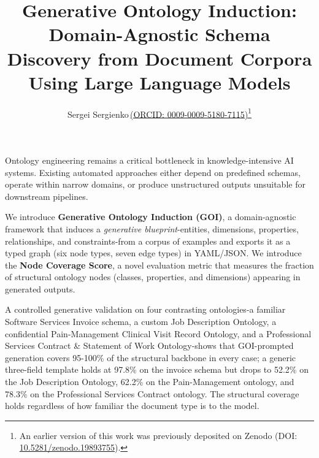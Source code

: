 \documentclass[runningheads,a4paper]{llncs}
\makeatletter
\renewenvironment{abstract}{%
  \list{}{\advance\topsep by0.35cm\relax\small
    \leftmargin=0pt
    \labelwidth=\z@
    \listparindent=\z@
    \itemindent\listparindent
    \rightmargin=0pt}%
  \item[\hskip\labelsep\bfseries\abstractname]}
{\endlist}
\makeatother
\begin{document}

\title{Generative Ontology Induction: Domain-Agnostic Schema Discovery
from Document Corpora Using Large Language Models}


\author{Sergei Sergienko\,\href{https://orcid.org/0009-0009-5180-7115}{(ORCID: 0009-0009-5180-7115)}\thanks{An earlier version of this work was previously deposited on Zenodo (DOI: \href{https://doi.org/10.5281/zenodo.19893755}{10.5281/zenodo.19893755}).}}



\maketitle

\begin{abstract}
{\normalsize
Ontology engineering remains a critical bottleneck in knowledge-intensive
AI systems. Existing automated approaches either depend on predefined
schemas, operate within narrow domains, or produce unstructured outputs
unsuitable for downstream pipelines.

We introduce \textbf{Generative Ontology Induction (GOI)}, a
domain-agnostic framework that induces a \emph{generative
blueprint}-entities, dimensions, properties, relationships, and
constraints-from a corpus of examples and exports it as a typed graph
(six node types, seven edge types) in YAML/JSON. We introduce the
\textbf{Node Coverage Score}, a novel evaluation metric that measures
the fraction of structural ontology nodes (classes, properties, and
dimensions) appearing in generated outputs.

A controlled generative validation on four contrasting ontologies-a
familiar Software Services Invoice schema, a custom Job Description
Ontology, a confidential Pain-Management Clinical Visit Record
Ontology, and a Professional Services Contract \& Statement of Work
Ontology-shows that GOI-prompted generation covers 95-100\% of the
structural backbone in every case; a generic three-field template
holds at 97.8\% on the invoice schema but drops to 52.2\% on the Job
Description Ontology, 62.2\% on the Pain-Management ontology, and
78.3\% on the Professional Services Contract ontology. The
structural coverage holds regardless of how familiar the document
type is to the model.

}
\end{abstract}
\end{document}

